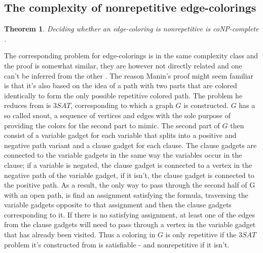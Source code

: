 \documentclass[12pt,a4paper]{article}
\newtheorem{theorem}{Theorem}
\begin{document}
\subsection{The complexity of nonrepetitive edge-colorings}

\begin{theorem}
Deciding whether an edge-coloring is nonrepetitive is coNP-complete \citep{Manin2008}.
\end{theorem}
The corresponding problem for edge-colorings is in the same complexity class and the proof is somewhat similar, they are however not directly related and one can't be inferred from the other \citep{Marx2009a}. The reason Manin's proof might seem familiar is that it's also based on the idea of a path with two parts that are colored identically to form the only possible repetitive colored path. The problem he reduces from is $3SAT$, corresponding to which a graph $G$ is constructed. $G$ has a so called snout, a sequence of vertices and edges with the sole purpose of providing the colors for the second part to mimic. The second part of $G$ then consist of a variable gadget for each variable that splits into a positive and negative path variant and a clause gadget for each clause. The clause gadgets are connected to the variable gadgets in the same way the variables occur in the clause; if a variable is negated, the clause gadget is connected to a vertex in the negative path of the variable gadget, if it isn't, the clause gadget is connected to the positive path. As a result, the only way to pass through the second half of G with an open path, is find an assignment satisfying the formula, traversing the variable gadgets opposite to that assignment and then the clause gadgets corresponding to it. If there is no satisfying assignment, at least one of the edges from the clause gadgets will need to pass through a vertex in the variable gadget that has already been visited. Thus a coloring in $G$ is only repetitive if the $3SAT$ problem it's constructed from is satisfiable - and nonrepetitive if it isn't.
\newline
\end{document}
